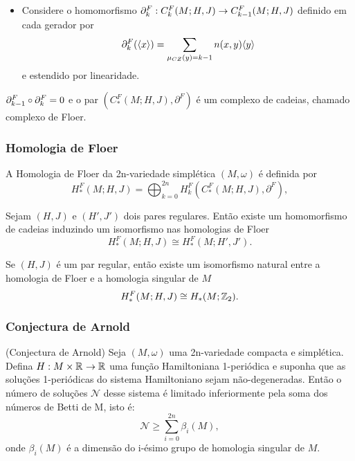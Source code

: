 \documentclass{beamer}
\begin{document}
\begin{footnotesize}
\begin{frame}
\begin{itemize}
				\item 
				Considere o homomorfismo $\partial_{k}^{F}: C^{F}_{k}(M;H,J)\to C^{F}_{k-1}(M;H,J)$ definido em cada gerador por
				$$
				\partial_{k}^{F}(\langle x\rangle) = \sum_{\mu_{CZ}(y)=k-1}n(x,y)\langle y\rangle
				$$
				e estendido por linearidade. 
				
			\end{itemize}
		
		\begin{teorema}
			 $\partial_{k-1}^{F}\circ\partial_{k}^{F} = 0$ e o par $(C^{F}_{*}(M;H,J), \partial^{F})$ é um complexo de cadeias, chamado complexo de Floer.
		\end{teorema}
	\end{frame}
	
		\begin{frame}
		\frametitle{Homologia de Floer}
			A Homologia de Floer da 2n-variedade simplética $(M,\omega)$ é definida por 
			$$
			H^{F}_{*}(M;H,J)=\bigoplus_{k=0}^{2n}H^{F}_{k}(C^{F}_{*}(M;H,J), \partial^{F}),
			$$
			
			\begin{teorema}
				Sejam $(H,J)$ e $(H',J')$ dois pares regulares. Então existe um homomorfismo de cadeias induzindo um isomorfismo nas homologias de Floer
				$$
				H^{F}_{*}(M;H,J) \cong 	H^{F}_{*}(M;H',J'). 
				$$
			\end{teorema}
			
			\begin{teorema}\label{teorema_isomorfismo_homologia_floer}
				Se $(H,J)$ é um par regular, então 
				existe um isomorfismo natural entre a homologia de Floer e a homologia singular de $M$
				$$
				H^{F}_{*}(M;H,J) \cong H_{*}(M;\mathbb{Z}_{2}). 
				$$
				
			\end{teorema}
			
	\end{frame}
	
	\begin{frame}
		\frametitle{Conjectura de Arnold}
		
			\begin{teorema}
				(Conjectura de Arnold) Seja $(M,\omega)$ uma 2n-variedade compacta e simplética. Defina $H:M\times \mathbb{R}^{} \to \mathbb{R}^{}$ uma função Hamiltoniana 1-periódica e suponha que as soluções 1-periódicas do sistema Hamiltoniano sejam não-degeneradas. Então o número de soluções $\mathcal{N}$ desse sistema é limitado inferiormente pela soma dos números de Betti de M, isto é:
				$$
				\mathcal{N}\geq \sum_{i=0}^{2n}\beta_{i}(M),
				$$
				onde $\beta_{i}(M)$ é a dimensão do i-ésimo grupo de homologia singular de $M$.
			\end{teorema}
	\end{frame}
	

\end{footnotesize}
\end{document}
